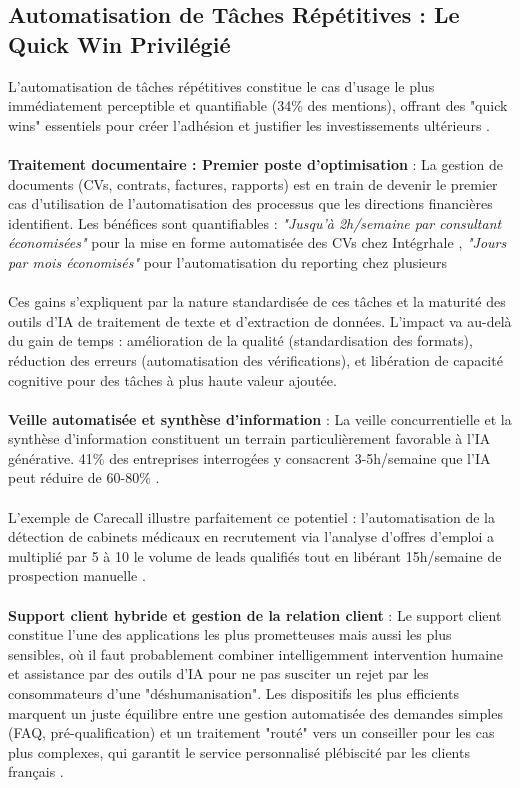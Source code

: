 \subsection{Automatisation de Tâches Répétitives : Le Quick Win Privilégié}

L'automatisation de tâches répétitives constitue le cas d'usage le plus immédiatement perceptible et quantifiable (34\% des mentions), offrant des "quick wins" essentiels pour créer l'adhésion et justifier les investissements ultérieurs \cite{luwai2025meetings}.
\\\\
\textbf{Traitement documentaire : Premier poste d'optimisation} :  La gestion de documents (CVs, contrats, factures, rapports) est en train de devenir le premier cas d'utilisation de l'automatisation des processus que les directions financières identifient. Les bénéfices sont quantifiables : \emph{"Jusqu’à 2h/semaine par consultant économisées"} pour la mise en forme automatisée des CVs chez Intégrhale \cite{luwai2025integrhale}, \emph{"Jours par mois économisés"} pour l'automatisation du reporting chez plusieurs 
\\\\
Ces gains s'expliquent par la nature standardisée de ces tâches et la maturité des outils d'IA de traitement de texte et d'extraction de données. L'impact va au-delà du gain de temps : amélioration de la qualité (standardisation des formats), réduction des erreurs (automatisation des vérifications), et libération de capacité cognitive pour des tâches à plus haute valeur ajoutée.
\\\\
\textbf{Veille automatisée et synthèse d'information} : La veille concurrentielle et la synthèse d'information constituent un terrain particulièrement favorable à l'IA générative. 41\% des entreprises interrogées y consacrent 3-5h/semaine que l'IA peut réduire de 60-80\% \cite{luwai2025meetings}.
\\\\
L'exemple de Carecall illustre parfaitement ce potentiel : l'automatisation de la détection de cabinets médicaux en recrutement via l'analyse d'offres d'emploi a multiplié par 5 à 10 le volume de leads qualifiés tout en libérant 15h/semaine de prospection manuelle \cite{luwai2025carecall}.
\\\\
\textbf{Support client hybride et gestion de la relation client} : Le support client constitue l'une des applications les plus prometteuses mais aussi les plus sensibles, où il faut probablement combiner intelligemment intervention humaine et assistance par des outils d'IA pour ne pas susciter un rejet par les consommateurs d'une "déshumanisation". Les dispositifs les plus efficients marquent un juste équilibre entre une gestion automatisée des demandes simples (FAQ, pré-qualification) et un traitement "routé" vers un conseiller pour les cas plus complexes, qui garantit le service personnalisé plébiscité par les clients français \cite{meyer2014culture}.

